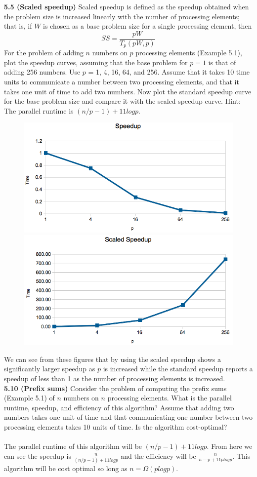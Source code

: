 \documentclass[11pt]{article}
\begin{document}
 {\bf 5.5 (Scaled speedup)} Scaled speedup is defined as the
 speedup obtained when the problem size is increased linearly
 with the number of processing elements; that is, if $W$ is chosen
 as a base problem size for a single processing element, then
 $$SS = \frac{pW}{T_p(pW,p)}$$
 For the problem of adding $n$ numbers on $p$ processing elements
 (Example 5.1), plot the speedup curves, assuming that the base
 problem for $p = 1$ is that of adding 256
 numbers. Use $p$ = 1, 4, 16, 64, and 256. Assume that it takes 10
 time units to communicate a number between two processing
 elements, and that it takes one unit of time to add two
 numbers. Now plot the standard speedup curve for the base
 problem size and compare it with the scaled speedup curve.
 Hint: The parallel runtime is $(n/p - 1) + 11 log p$.\\
 \begin{figure}[h]
   \includegraphics[width=.5\textwidth]{images/speedup.png}
   \includegraphics[width=.5\textwidth]{images/scaled_speedup.png}
 \end{figure}
 We can see from these figures that by using the scaled speedup
 shows a significantly larger speedup as $p$ is increased while
 the standard speedup reports a speedup of less than 1 as the
 number of processing elements is increased.\\
 
 {\bf 5.10 (Prefix sums)} Consider the problem of computing the
 prefix sums (Example 5.1) of $n$ numbers on $n$ processing
 elements. What is the parallel runtime, speedup, and
 efficiency of this algorithm? Assume that adding two numbers
 takes one unit of time and that communicating one number
 between two processing elements takes 10 units of time. Is the
 algorithm cost-optimal?\\\\
 The parallel runtime of this algorithm will be
 $(n/p-1)+11logp$. From here we can see the speedup is
 $\frac{n}{(n/p-1)+11logp}$ and the efficiency will be
 $\frac{n}{n-p+11plogp}$. This algorithm will be cost optimal so
 long as $n=\Omega(plogp)$.\\
\end{document}
